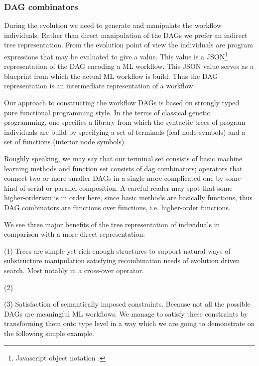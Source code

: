 \documentclass{ws-ijait}
\begin{document}
\subsubsection{DAG combinators}

During the evolution we need to generate and manipulate the workflow individuals. Rather than direct manipulation of the DAGs we prefer an indirect tree representation. From the evolution point of view the individuals are program expressions that may be  evaluated to give a value. This value is a JSON\footnote{Javascript object notation .} representation of the DAG encoding a ML workflow. This JSON value serves as a blueprint from which the actual ML workflow is build. Thus the DAG representation is an intermediate representation of a workflow.

Our approach to constructing the workflow DAGs is based on strongly typed pure functional programming style. In the terms of classical genetic programming, one specifies a library from which the syntactic trees of program individuals are build by specifying a set of terminals (leaf node symbols) and a set of functions (interior node symbols). 

Roughly speaking, we may say that our terminal set consists of basic machine learning methods and function set consists of dag combinators; operators that connect two or more smaller DAGs in a single more complicated one by some kind of serial or parallel composition. A careful reader may spot that some higher-orderism is in order here, since basic methods are basically functions, thus DAG combinators are functions over functions, i.e. higher-order functions.

We see three major benefits of the tree representation of individuals in comparison with a more direct representation:

(1) Trees are simple yet rich enough structures to support natural ways of substructure manipulation satisfying recombination needs of evolution driven search. Most notably in a cross-over operator. 

(2) 

(3) Satisfaction of semantically imposed constraints. Because not all the possible DAGs are meaningful ML workflows. We manage to satisfy these constraints by transforming them onto type level in a way which we are going to demonstrate on the following simple example.
\end{document}
